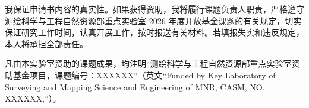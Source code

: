 我保证申请书内容的真实性。如果获得资助，我将履行课题负责人职责，严格遵守测绘科学与工程自然资源部重点实验室 2026 年度开放基金课题的有关规定，切实保证研究工作时间，认真开展工作，按时报送有关材料。若填报失实和违反规定，本人将承担全部责任。

\vspace{2.3bp}
凡由本实验室资助的课题成果，均注明“测绘科学与工程自然资源部重点实验室资助基金项目，课题编号：XXXXXX”（英文“Funded by Key Laboratory of Surveying and Mapping Science and Engineering of MNR, CASM, NO. XXXXXX,”）。
